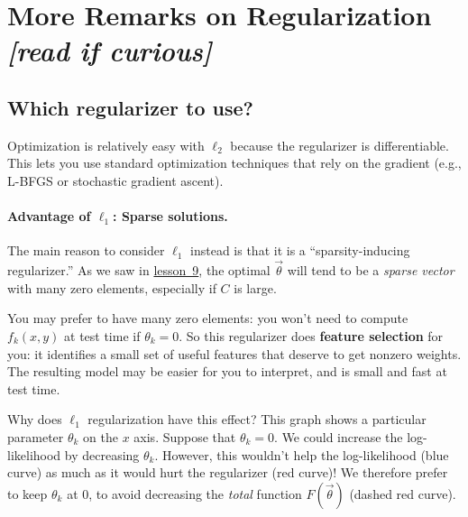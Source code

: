 \documentclass[11pt]{article}
\newcommand{\vtheta}{\vec{\theta}}
\newcommand{\lesson}[1]{\href{http://cs.jhu.edu/~jason/tutorials/loglin/\##1}{lesson~#1}}
\begin{document}
\section{More Remarks on Regularization {\em [read if curious]}}

\subsection{Which regularizer to use?}

%

Optimization is relatively easy with $\ell_2$ because the regularizer
is differentiable.  This lets you use standard optimization techniques
that rely on the gradient (e.g., L-BFGS or stochastic gradient ascent).

\paragraph{Advantage of $\ell_1$:  Sparse solutions.}  The main reason to consider $\ell_1$ instead is that it is a ``sparsity-inducing regularizer.''  As we saw in \lesson{9}, the optimal $\vtheta$ will tend to be a {\em sparse vector} with many zero elements, especially if $C$ is large.

You may prefer to have many zero elements: you won't need to compute $f_k(x,y)$ at test time if $\theta_k=0$.  So this regularizer does {\bf feature selection} for you: it identifies a small set of useful features that deserve to get nonzero weights.  The resulting model may be easier for you to interpret, and is small and fast at test time.

Why does $\ell_1$ regularization have this effect?  This graph shows a particular parameter $\theta_k$ on the $x$ axis.  Suppose that $\theta_k=0$.  We could increase the log-likelihood by decreasing $\theta_k$.  However, this wouldn't help the log-likelihood (blue curve) as much as it would hurt the regularizer (red curve)!  We therefore prefer to keep $\theta_k$ at 0, to avoid decreasing the {\em total} function $F(\vtheta)$ (dashed red curve).
\end{document}
